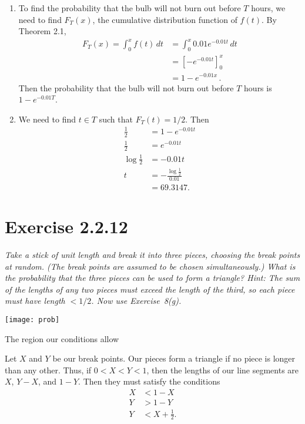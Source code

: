 \documentclass{tufte-handout}
\begin{document}
\bigskip

\begin{enumerate}[label=(\alph*)]
\item To find the probability that the bulb will not burn out
  before $T$ hours, we need to find $F_T(x)$, the cumulative distribution
  function of $f(t)$. By Theorem 2.1,
  \begin{align*}
    F_T(x) = \int_{0}^x \! f(t) \, dt &= \int_{0}^x \!
                                        0.01 e^{-0.01 t} \, dt \\
                                      &= \left[ -e^{-0.01t} \right]_0^x \\
                                      &= 1 - e^{-0.01x} \, .
  \end{align*}
  Then the probability that the bulb will not burn out before $T$
  hours is $1-e^{-0.01T}$.
\item We need to find $t \in T$ such that $F_T(t) = 1/2$. Then
  \begin{align*}
    \frac{1}{2} &= 1 - e^{-0.01t} \\
    \frac{1}{2} &= e^{-0.01t} \\
    \log{\frac{1}{2}} &= -0.01t \\
    t &= -\frac{\log{\frac{1}{2}}}{0.01} \\
                &= 69.3147.
  \end{align*}
\end{enumerate}

\section{Exercise 2.2.12}

\emph{Take a stick of unit length and break it into three pieces,
  choosing the break points at random. (The break points are assumed
  to be chosen simultaneously.) What is the probability that the three
  pieces can be used to form a triangle? \emph{Hint}: The sum of the
  lengths of any two pieces must exceed the length of the third, so
  each piece must have length $< 1/2$. Now use Exercise~8(g).}

\bigskip

\begin{marginfigure}
  \texttt{[image: prob]}
  \caption{The region our conditions allow}
  \label{fig:prob}
\end{marginfigure}

Let $X$ and $Y$ be our break points. Our pieces form a triangle if no
piece is longer than any other. Thus, if $0<X<Y<1$, then the lengths
of our line segments are $X$, $Y-X$, and $1-Y$. Then they must satisfy
the conditions
\begin{align*}
  X &< 1 - X \\
  Y &> 1 - Y \\
  Y &< X + \frac{1}{2}.
\end{align*}
\end{document}
